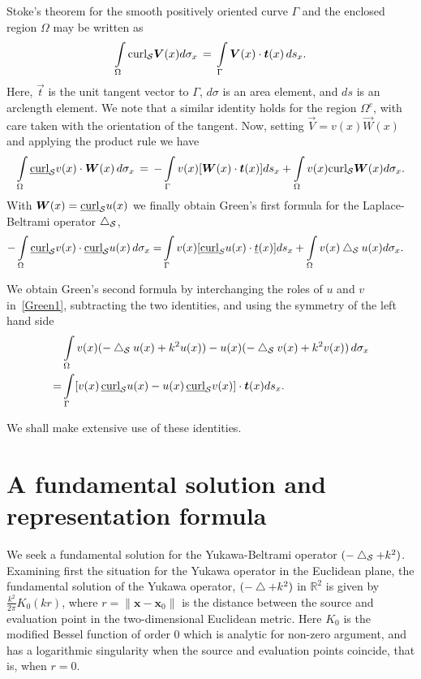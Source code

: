 Stoke's theorem for the  smooth positively oriented curve $\Gamma$ and
the enclosed region $\Omega$ may be written  as
\begin{align*}
  \int\limits_{\Omega} \mbox{curl}_{\S} \vec{V}(x) d\sigma_x \, = \,
  \int\limits_\Gamma \vec{V}(x) \cdot \vec{t}(x) \, ds_x .
\end{align*}
Here, $\vec{t}$ is the unit tangent vector to $\Gamma$, $d\sigma$ is an
area element, and $ds$ is an arclength element. We note that a similar
identity holds for the region $\Omega^{c}$, with care taken with the
orientation of the tangent.  Now, setting $\vec{V} = v(x) \vec{W}(x)$
and applying the product rule we have
\begin{align*}
  \int\limits_{\Omega} \underline{\mbox{curl}}_{\S} v(x) \cdot
  \vec{W}(x) \, d\sigma_x \, = \, 
  -\int\limits_{\Gamma} v(x) [\vec{W}(x) \cdot \vec{t}(x)] ds_x +
  \int\limits_{\Omega} v(x) \mbox{curl}_{\S} \vec{W}(x) d\sigma_x .
\end{align*}
With $\vec{W}(x) = \underline{\mbox{curl}}_{\S} u(x)$ we finally
obtain Green's first formula for the Laplace-Beltrami operator
$\bigtriangleup_{\mathcal{S}}$,
\begin{align}
  \label{Green1}
  -\int\limits_{\Omega} \underline{\mbox{curl}}_{\mathcal{S}} v(x) \cdot
  \underline{\mbox{curl}}_{\mathcal{S}} u(x) \, d\sigma_x 
  =& \int\limits_{\Gamma} v(x) [\underline{\mbox{curl}}_S u(x) \cdot 
  \underline{t}(x)] ds_x +\int\limits_{\Omega} v(x) \bigtriangleup_{\mathcal{S}}u(x) d\sigma_x.
\end{align}

We obtain Green's second formula by interchanging the roles of $u$ and
$v$ in~\eqref{Green1}, subtracting the two identities, and using the
symmetry of the left hand side
\begin{align}
  &\int\limits_{\Omega} v(x)(-\lap_{\S}u(x) + k^2 u(x))-
  u(x)(-\lap_{\S}v(x) +k^2v(x))\, d\sigma_x \nonumber \\
  =&\int\limits_\Gamma [v(x)\,\underline{\mbox{curl}}_{\S} 
  u(x) - u(x)\, \underline{\mbox{curl}}_{\S}v(x)] \cdot 
  \vec{t}(x) ds_x.
  \label{Green2}
\end{align}

We shall make extensive use of these identities.





\section{A fundamental solution and representation formula}
We seek a fundamental solution for the Yukawa-Beltrami operator
$(-\bigtriangleup_{\mathcal{S}} + k^2)$.  Examining first the situation for the Yukawa
operator in the Euclidean plane, the fundamental solution of the Yukawa
operator, $(-\bigtriangleup + k^2)$ in $\mathbb{R}^2$ is given by
$\frac{k^2}{2\pi} K_{0}(kr)$, where $r=\|\mathbf{x} - \mathbf{x}_{0}\|$
is the distance between the source and evaluation point in the
two-dimensional Euclidean metric. Here $K_{0}$ is the modified Bessel
function of order 0 which is analytic for non-zero argument, and has a
logarithmic singularity when the source and evaluation points coincide,
that is, when $r=0$.

